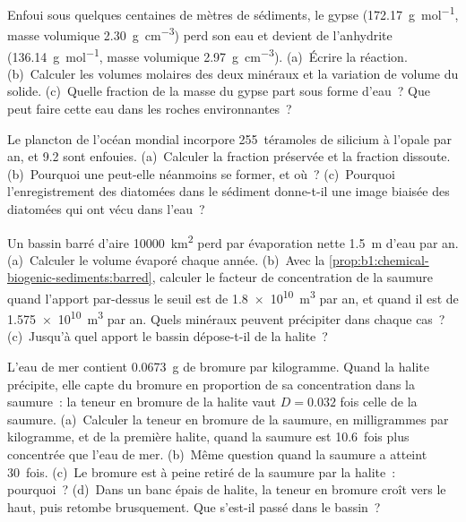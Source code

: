 \begin{exercise}[$\star\star$]\label{exo:b1:chemical-biogenic-sediments:8}
Enfoui sous quelques centaines de mètres de sédiments, le gypse 
(\qty{172.17}{g.mol^{-1}}, masse volumique \qty{2.30}{g.cm^{-3}}) perd son eau et
devient de l'anhydrite  (\qty{136.14}{g.mol^{-1}}, masse volumique
\qty{2.97}{g.cm^{-3}}). (a)~Écrire la réaction. (b)~Calculer les volumes molaires des
deux minéraux et la variation de volume du solide. (c)~Quelle fraction de
la masse du gypse part sous forme d'eau~? Que peut faire cette eau dans les roches
environnantes~?
\end{exercise}

\begin{exercise}[$\star\star$]\label{exo:b1:chemical-biogenic-sediments:9}
Le plancton de l'océan mondial incorpore 255~téramoles de silicium à l'opale par
an, et 9.2 sont enfouies. (a)~Calculer la fraction préservée et la fraction
dissoute. (b)~Pourquoi une  peut-elle néanmoins se former, et où~? (c)~Pourquoi
l'enregistrement des diatomées dans le sédiment donne-t-il une image biaisée des diatomées qui
ont vécu dans l'eau~?
\end{exercise}

\begin{exercise}[$\star\star\star$]\label{exo:b1:chemical-biogenic-sediments:10}
Un bassin barré d'aire \qty{10000}{km^2} perd par évaporation nette \qty{1.5}{m}
d'eau par an. (a)~Calculer le volume évaporé chaque année. (b)~Avec la
\cref{prop:b1:chemical-biogenic-sediments:barred}, calculer le facteur de concentration
de la saumure quand l'apport par-dessus le seuil est de \qty{1.8e10}{m^3} par an,
et quand il est de \qty{1.575e10}{m^3} par an. Quels minéraux peuvent précipiter dans
chaque cas~? (c)~Jusqu'à quel apport le bassin dépose-t-il de la halite~?
\end{exercise}

\begin{exercise}[$\star\star\star$]\label{exo:b1:chemical-biogenic-sediments:11}
L'eau de mer contient \qty{0.0673}{g} de bromure par kilogramme. Quand la halite
précipite, elle capte du bromure en proportion de sa concentration dans la
saumure~: la teneur en bromure de la halite vaut $D = 0.032$ fois celle de la
saumure. (a)~Calculer la teneur en bromure de la saumure, en milligrammes par
kilogramme, et de la première halite, quand la saumure est 10.6~fois plus concentrée que
l'eau de mer. (b)~Même question quand la saumure a atteint 30~fois. (c)~Le bromure est
à peine retiré de la saumure par la halite~: pourquoi~? (d)~Dans un banc épais de halite,
la teneur en bromure croît vers le haut, puis retombe brusquement. Que s'est-il passé dans
le bassin~?
\end{exercise}

